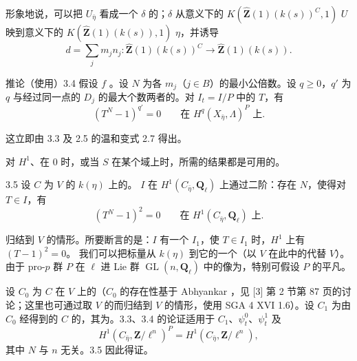 形象地说，可以把 $U_{\bar\eta}$ 看成一个 $\delta$ 的；$\delta$ 从意义下的 $K(\widehat{\mathbf Z}(1)(k(s))^C,1)$  $U$ 映到意义下的 $K(\widehat{\mathbf Z}(1)(k(s)),1)$  $\eta$，并诱导
\[
d=\sum_jm_jn_j:\widehat{\mathbf Z}(1)(k(s))^C\longrightarrow
\widehat{\mathbf Z}(1)(k(s)).
\]
\begin{SGAresult}{推论（使用）}{3.4}
假设 $f$ 。设 $N$ 为各 $m_j$（$j\in B$）的最小公倍数。设 $q\ge0$，$q'$ 为 $q$ 与经过同一点的 $D_j$ 的最大个数两者的。对 $I_t=I/P$ 中的 $T$，有
\[
(T^N-1)^{q'}=0\qquad\text{在 }H^q(X_{\bar\eta},\Lambda)^P\text{ 上}.
\]
\end{SGAresult}
这立即由 3.3 及 2.5 的温和变式 2.7 得出。

对 $H^1$、在 $0$ 时，或当 $S$ 在某个域上时，所需的结果都是可用的。

\begin{SGAresult}{}{3.5}
设 $C$ 为 $V$ 的 $k(\eta)$ 上的。 $I$ 在 $H^1(C_{\bar\eta},\mathbf Q_\ell)$ 上通过二阶：存在 $N$，使得对 $T\in I$，有
\[
(T^N-1)^2=0\qquad\text{在 }H^1(C_{\bar\eta},\mathbf Q_\ell)\text{ 上}.
\]
\end{SGAresult}
归结到 $V$ 的情形。所要断言的是：$I$ 有一个 $I_1$，使 $T\in I_1$ 时，$H^1$ 上有 $(T-1)^2=0$。
我们可以把标量从 $k(\eta)$ 到它的一个（以 $V$ 在此中的代替 $V$）。由于 pro-$p$ 群 $P$ 在 $\ell$ 进 Lie 群 $\operatorname{GL}(n,\mathbf Q_\ell)$ 中的像为，特别可假设 $P$ 的平凡。

设 $C_0$ 为 $C$ 在 $V$ 上的（$C_0$ 的存在性基于 Abhyankar ，见 [3] 第 2 节第 87 页的讨论；这里也可通过取 $V$ 的而归结到 $V$ 的情形，使用 SGA 4 XVI 1.6）。设 $C_1$ 为由 $C_0$ 经得到的 $C$ 的，其为。3.3、3.4 的论证适用于 $C_1$、$\psi_t^0$、$\psi_t^1$ 及
\[
H^1(C_{\bar\eta},\mathbf Z/\ell^n)^P=H^1(C_{\bar\eta},\mathbf Z/\ell^n),
\]
其中 $N$ 与 $n$ 无关。3.5 因此得证。


